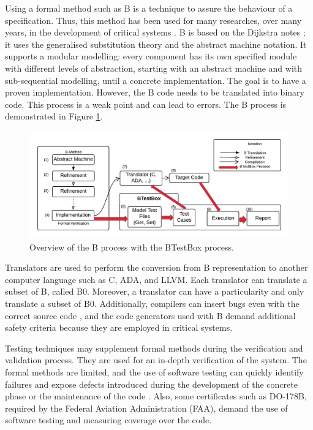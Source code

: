 \documentclass[runningheads]{llncs}
\begin{document}
Using a formal method such as B is a technique to assure the behaviour of a specification.
Thus, this method has been used for many researches, over many years, in the development of critical systems \cite{valerio_thesis:2016}. B is based on the Dijkstra notes \cite{dijkstra1976discipline}; it uses the generalised substitution theory \cite{hoare2002proof} and the abstract machine notation. It supports a modular modelling:  every component has its own specified module with different levels of abstraction, starting with an abstract machine and with sub-sequential modelling, until a concrete implementation. The goal is to have a proven implementation. However, the B code needs to be translated into binary code. This process is a weak point and can lead to errors. The B process is demonstrated in Figure \ref{fig:Bmethod}.

\begin{figure}[ht]
    \centering
    \includegraphics[width = \textwidth]{imagens/BMethodBTestBoxColor.png}
    \caption{Overview of the B process with the BTestBox process.}
    \label{fig:Bmethod}
\end{figure}

Translators are used to perform the conversion from B representation to another computer language such as C, ADA, and LLVM. Each translator can translate a subset of B, called B0. Moreover, a translator can have a particularity and only translate a subset of B0. %
Additionally, compilers can insert bugs even with the correct source code \cite{leroy2009formal}, and the code generators used with B demand additional safety criteria because they are employed in critical systems.

Testing techniques may supplement formal methods during the verification and validation process. They are used for an in-depth verification of the system. The formal methods are limited, and the use of software testing can quickly identify failures and expose defects introduced during the development of the concrete phase or the maintenance of the code \cite{ernesto_thesis:2016}. Also, some certificates such as DO-178B, required by the Federal Aviation Administration (FAA), demand the use of software testing and measuring coverage over the code.
\end{document}
